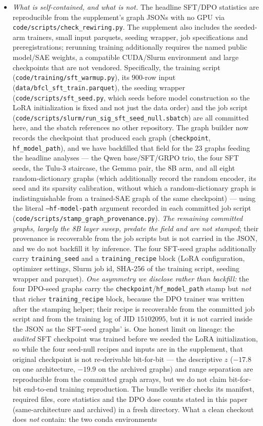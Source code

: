 \documentclass{article}
\begin{document}
\begin{itemize}[leftmargin=*]
\item \emph{What is self-contained, and what is not.} The headline SFT/DPO statistics are reproducible from the supplement's graph JSONs with no GPU via \texttt{code/scripts/check\_rewiring.py}. The supplement also includes the seeded-arm trainers, small input parquets, seeding wrapper, job specifications and preregistrations; rerunning training additionally requires the named public model/SAE weights, a compatible CUDA/Slurm environment and large checkpoints that are not vendored. Specifically, the training script (\texttt{code/training/sft\_warmup.py}), its $900$-row input (\texttt{data/bfcl\_sft\_train.parquet}), the seeding wrapper (\texttt{code/scripts/sft\_seed.py}, which seeds before model construction so the LoRA initialization is fixed and not just the data order) and the job script (\texttt{code/scripts/slurm/run\_sig\_sft\_seed\_null.sbatch}) are all committed here, and the sbatch references no other repository. The graph builder now records the checkpoint that produced each graph (\texttt{checkpoint}, \texttt{hf\_model\_path}), and we have backfilled that field for the $23$ graphs feeding the headline analyses --- the Qwen base/SFT/GRPO trio, the four SFT seeds, the Tulu-3 staircase, the Gemma pair, the 8B arm, and all eight random-dictionary graphs (which additionally record the random encoder, its seed and its sparsity calibration, without which a random-dictionary graph is indistinguishable from a trained-SAE graph of the same checkpoint) --- using the literal \texttt{--hf-model-path} argument recorded in each committed job script (\texttt{code/scripts/stamp\_graph\_provenance.py}). \emph{The remaining committed graphs, largely the 8B layer sweep, predate the field and are not stamped}; their provenance is recoverable from the job scripts but is not carried in the JSON, and we do not backfill it by inference. The four SFT-seed graphs additionally carry \texttt{training\_seed} and a \texttt{training\_recipe} block (LoRA configuration, optimizer settings, Slurm job id, SHA-256 of the training script, seeding wrapper and parquet). \emph{One asymmetry we disclose rather than backfill:} the four DPO-seed graphs carry the \texttt{checkpoint}/\texttt{hf\_model\_path} stamp but \emph{not} that richer \texttt{training\_recipe} block, because the DPO trainer was written after the stamping helper; their recipe is recoverable from the committed job script and from the training log of JID $15102095$, but it is not carried inside the JSON as the SFT-seed graphs' is. One honest limit on lineage: the \emph{audited} SFT checkpoint was trained before we seeded the LoRA initialization, so while the four seed-null recipes and inputs are in the supplement, that original checkpoint is not re-derivable bit-for-bit --- the descriptive $z$ ($-17.8$ on one architecture, $-19.9$ on the archived graphs) and range separation are reproducible from the committed graph arrays, but we do not claim bit-for-bit end-to-end training reproduction. The bundle verifier checks its manifest, required files, core statistics and the DPO dose counts stated in this paper (same-architecture and archived) in a fresh directory. What a clean checkout does \emph{not} contain: the two conda environments 
\end{itemize}
\end{document}
